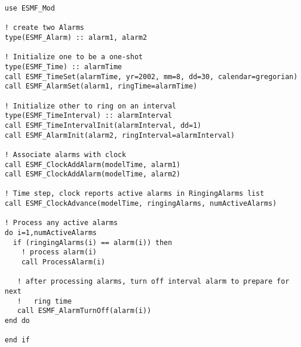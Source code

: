 
\begin{verbatim}
use ESMF_Mod

! create two Alarms
type(ESMF_Alarm) :: alarm1, alarm2

! Initialize one to be a one-shot
type(ESMF_Time) :: alarmTime
call ESMF_TimeSet(alarmTime, yr=2002, mm=8, dd=30, calendar=gregorian)
call ESMF_AlarmSet(alarm1, ringTime=alarmTime)

! Initialize other to ring on an interval
type(ESMF_TimeInterval) :: alarmInterval
call ESMF_TimeIntervalInit(alarmInterval, dd=1)
call ESMF_AlarmInit(alarm2, ringInterval=alarmInterval)

! Associate alarms with clock
call ESMF_ClockAddAlarm(modelTime, alarm1)
call ESMF_ClockAddAlarm(modelTime, alarm2)

! Time step, clock reports active alarms in RingingAlarms list
call ESMF_ClockAdvance(modelTime, ringingAlarms, numActiveAlarms)

! Process any active alarms
do i=1,numActiveAlarms
  if (ringingAlarms(i) == alarm(i)) then
    ! process alarm(i)
    call ProcessAlarm(i)

   ! after processing alarms, turn off interval alarm to prepare for next
   !   ring time
   call ESMF_AlarmTurnOff(alarm(i))
end do

end if
\end{verbatim}

